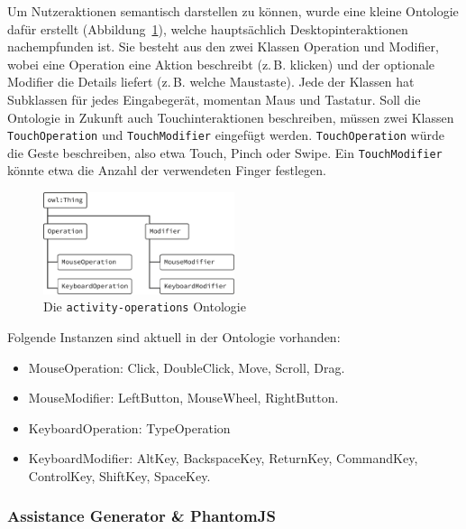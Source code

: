\documentclass[
	headsepline,
	footsepline,
	fontsize=12pt,
	bibliography=totoc
]{scrbook}
\begin{document}
Um Nutzeraktionen semantisch darstellen zu können, wurde eine kleine Ontologie dafür erstellt (Abbildung~\ref{figure:activity-ops}), welche hauptsächlich Desktopinteraktionen nachempfunden ist. Sie besteht aus den zwei Klassen Operation und Modifier, wobei eine Operation eine Aktion beschreibt (z.\,B. klicken) und der optionale Modifier die Details liefert (z.\,B. welche Maustaste). Jede der Klassen hat Subklassen für jedes Eingabegerät, momentan Maus und Tastatur. Soll die Ontologie in Zukunft auch Touchinteraktionen beschreiben, müssen zwei Klassen \texttt{TouchOperation} und \texttt{TouchModifier} eingefügt werden. \texttt{TouchOperation} würde die Geste beschreiben, also etwa Touch, Pinch oder Swipe. Ein \texttt{TouchModifier} könnte etwa die Anzahl der verwendeten Finger festlegen.

\begin{figure}[htbp]
   \centering
   \includegraphics[width=0.5\textwidth]{images/implementierung-activity-ops.png}
   \caption{Die \texttt{activity-operations} Ontologie}
   \label{figure:activity-ops}
\end{figure}

Folgende Instanzen sind aktuell in der Ontologie vorhanden:

\begin{itemize}
	\item MouseOperation: Click, DoubleClick, Move, Scroll, Drag.
	\item MouseModifier: LeftButton, MouseWheel, RightButton.
	\item KeyboardOperation: TypeOperation
	\item KeyboardModifier: AltKey, BackspaceKey, ReturnKey, CommandKey, ControlKey, ShiftKey, SpaceKey.
\end{itemize}


\subsubsection{Assistance Generator \& PhantomJS}

\end{document}
